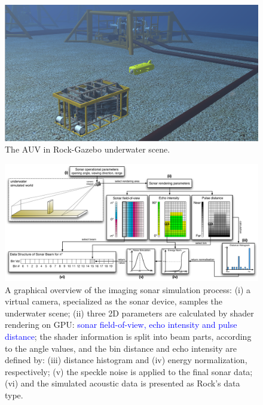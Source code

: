 \documentclass[final,5p,times]{elsarticle}
\begin{document}
\begin{figure}[t]
    \includegraphics[width=\columnwidth]{figs/uwscene}
    \centering
    \captionsetup{justification=justified}
    \caption{The AUV in Rock-Gazebo underwater scene.}
    \label{fig:uwscene}
\end{figure}


\begin{figure}[t]
    \includegraphics[width=0.85\paperwidth]{figs/sonar_sim}
    \centering
    \captionsetup{justification=justified}
    \caption{A graphical overview of the imaging sonar simulation process: (i) a virtual camera, specialized as the sonar device, samples the underwater scene; (ii) three 2D parameters are calculated by shader rendering on GPU: \textcolor{blue}{sonar field-of-view, echo intensity and pulse distance}; the shader information is split into beam parts, according to the angle values, and the bin distance and echo intensity are defined by: (iii) distance histogram and (iv) energy normalization, respectively; (v) the speckle noise is applied to the final sonar data; (vi) and the simulated acoustic data is presented as Rock's data type.}
    \label{fig:sonar_sim}
\end{figure}
\end{document}
